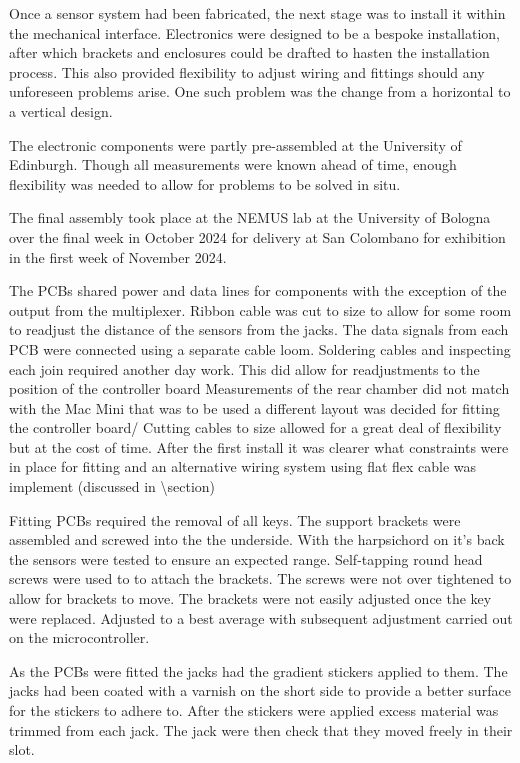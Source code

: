 Once a sensor system had been fabricated, the next stage was to install it within the mechanical interface.  Electronics were designed to be a bespoke installation, after which brackets and enclosures could be drafted to hasten the installation process. This also provided flexibility to adjust wiring and fittings should any unforeseen problems arise. One such problem was the change from a horizontal to a vertical design.

The electronic components were partly pre-assembled at the University of
Edinburgh. Though all measurements were known ahead of time, enough flexibility was
needed to allow for problems to be solved in situ.

The final assembly took place at the NEMUS lab at the University of Bologna over
the final week in October 2024 for delivery at San Colombano for exhibition in
the first week of November 2024.

The PCBs shared power and data lines for components with the exception of the
output from the multiplexer. Ribbon cable was cut to size to allow for some room
to readjust the distance of the sensors from the jacks. The data signals from
each PCB were connected using a separate cable loom. Soldering cables and
inspecting each join required another day work. This did allow for readjustments
to the position of the controller board Measurements of the rear chamber did not
match with the Mac Mini that was to be used a different layout was decided for
fitting the controller board/ Cutting cables to size allowed for a great deal of
flexibility but at the cost of time. After the first install it was clearer what
constraints were in place for fitting and an alternative wiring system using
flat flex cable was implement (discussed in \textbackslash section)

Fitting PCBs required the removal of all keys. The support brackets were
assembled and screwed into the the underside. With the harpsichord on it's back
the sensors were tested to ensure an expected range. Self-tapping round head
screws were used to to attach the brackets. The screws were not over tightened
to allow for brackets to move. The brackets were not easily adjusted once the
key were replaced. Adjusted to a best average with subsequent adjustment carried
out on the microcontroller.

As the PCBs were fitted the jacks had the gradient stickers applied to them. The
jacks had been coated with a varnish on the short side to provide a better
surface for the stickers to adhere to. After the stickers were applied excess
material was trimmed from each jack. The jack were then check that they moved
freely in their slot.

